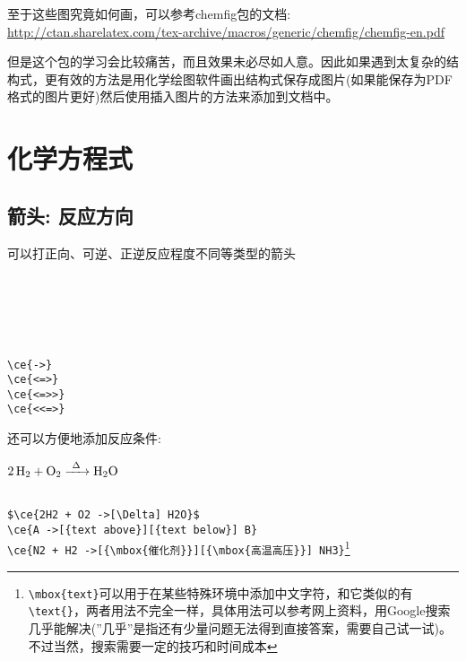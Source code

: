 \documentclass[UTF8, a4paper]{article}
\begin{document}
至于这些图究竟如何画，可以参考chemfig包的文档: \url{http://ctan.sharelatex.com/tex-archive/macros/generic/chemfig/chemfig-en.pdf}

但是这个包的学习会比较痛苦，而且效果未必尽如人意。因此如果遇到太复杂的结构式，更有效的方法是用化学绘图软件画出结构式保存成图片(如果能保存为PDF格式的图片更好)然后使用插入图片的方法来添加到文档中。

\section{化学方程式}
\subsection{箭头: 反应方向}
可以打正向、可逆、正逆反应程度不同等类型的箭头\newline

\begin{minipage}{.3\textwidth} %
	\ \ce{->}\\
	\ce{<=>}\\
	\ce{<=>>}\\
	\ce{<<=>}\\
\end{minipage} %
\begin{minipage}{.7\textwidth} %
	\verb|\ce{->}|\\
	\verb|\ce{<=>}|\\
	\verb|\ce{<=>>}|\\
	\verb|\ce{<<=>}|\\
\end{minipage}

还可以方便地添加反应条件:

\begin{minipage}{.3\textwidth} %
	$\ce{2H2 + O2 ->[\Delta] H2O}$\\
	\\
\end{minipage} %
\begin{minipage}{.7\textwidth} %
	\verb|$\ce{2H2 + O2 ->[\Delta] H2O}$|\\
	\verb|\ce{A ->[{text above}][{text below}] B}|\\
	\verb|\ce{N2 + H2 ->[{\mbox{催化剂}}][{\mbox{高温高压}}] NH3}|\footnote{ {\verb|\mbox{text}|}可以用于在某些特殊环境中添加中文字符，和它类似的有\verb|\text{}|，两者用法不完全一样，具体用法可以参考网上资料，用Google搜索几乎能解决(''几乎''是指还有少量问题无法得到直接答案，需要自己试一试)。不过当然，搜索需要一定的技巧和时间成本}
\end{minipage}
\end{document}
